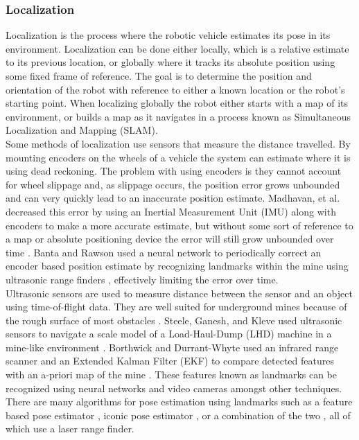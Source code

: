 \subsubsection{Localization}
\label{sec:local}

Localization is the process where the robotic vehicle estimates its pose in its environment. Localization can be done either locally, which is a relative estimate to its previous location, or globally where it tracks its absolute position using some fixed frame of reference. The goal is to determine the position and orientation of the robot with reference to either a known location or the robot's starting point. When localizing globally the robot either starts with a map of its environment, or builds a map as it navigates in a process known as Simultaneous Localization and Mapping (SLAM).\\

Some methods of localization use sensors that measure the distance travelled. By mounting encoders on the wheels of a vehicle the system can estimate where it is using dead reckoning. The problem with using encoders is they cannot account for wheel slippage and, as slippage occurs, the position error grows unbounded and can very quickly lead to an inaccurate position estimate. Madhavan, et al. decreased this error by using an Inertial Measurement Unit (IMU) along with encoders to make a more accurate estimate, but without some sort of reference to a map or absolute positioning device the error will still grow unbounded over time \cite{madhavan}. Banta and Rawson used a neural network to periodically correct an encoder based position estimate by recognizing landmarks within the mine using ultrasonic range finders \cite{fusion}, effectively limiting the error over time.\\

Ultrasonic sensors are used to measure distance between the sensor and an object using time-of-flight data. They are well suited for underground mines because of the rough surface of most obstacles \cite{proof}. Steele, Ganesh, and Kleve used ultrasonic sensors to navigate a scale model of a Load-Haul-Dump (LHD) machine in a mine-like environment \cite{ganesh}. Borthwick and Durrant-Whyte used an infrared range scanner and an Extended Kalman Filter (EKF) to compare detected features with an a-priori map of the mine \cite{borth}. These features known as landmarks can be recognized using neural networks \cite{neural} and video cameras \cite{video} amongst other techniques. There are many algorithms for pose estimation using landmarks such as a feature based pose estimator \cite{feature}, iconic pose estimator \cite{iconic}, or a combination of the two \cite{both}, all of which use a laser range finder.\\

